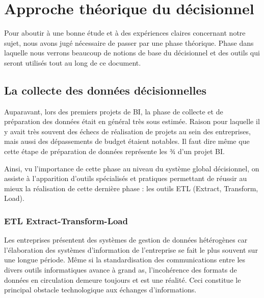 \documentclass[12pt,a4wide,twoside]{report}
\begin{document}
																\chapter{Approche théorique du décisionnel}
Pour aboutir à une bonne étude et à des expériences claires concernant notre sujet, nous avons jugé nécessaire de passer par une phase théorique. Phase dans laquelle nous verrons beaucoup de notions de base du décisionnel et des outils qui seront utilisés tout au long de ce document.
	
		

	\section{La collecte des données décisionnelles}
	
	Auparavant, lors des premiers projets de BI, la phase de collecte et de préparation des données était en général très sous estimée. Raison pour laquelle il y avait très souvent des échecs de réalisation de projets au sein des entreprises, mais aussi des dépassements de budget étaient notables. Il faut dire même que cette étape de préparation de données représente les ¾ d’un projet BI. \newline
	
Ainsi, vu l’importance de cette phase au niveau du système global décisionnel, on assiste à l’apparition d’outils spécialisés et pratiques permettant de réussir au mieux la réalisation de cette dernière phase : les outils ETL (Extract, Transform, Load). 

		\subsection{ETL Extract-Transform-Load}
Les entreprises présentent des systèmes de gestion de données hétérogènes car l’élaboration des systèmes d’information de l’entreprise se fait le plus souvent sur une longue période. Même si la standardisation des communications entre les divers outils informatiques avance à grand as, l’incohérence des formats de données en circulation demeure toujours et est une réalité. Ceci constitue le principal obstacle technologique aux échanges d’informations. \newline
\end{document}
